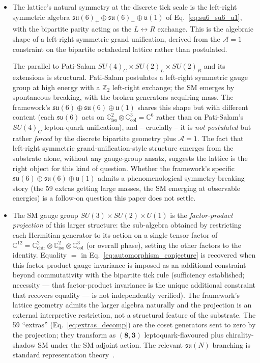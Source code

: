\begin{itemize}
\item The lattice's natural symmetry at the discrete tick scale
is the left-right symmetric algebra
$\mathfrak{su}(6)_+ \oplus \mathfrak{su}(6)_- \oplus \mathfrak{u}(1)$
of Eq.~\eqref{eq:su6_su6_u1}, with the bipartite parity acting as
the $L \leftrightarrow R$ exchange.  This is the algebraic shape
of a left-right symmetric grand unification, derived from the
$\mathcal{A}=1$ constraint on the bipartite octahedral lattice
rather than postulated.

The parallel to Pati-Salam $SU(4)_C \times SU(2)_L \times SU(2)_R$
and its extensions is structural.  Pati-Salam postulates a
left-right symmetric gauge group at high energy with a
$\mathbb{Z}_2$ left-right exchange; the SM emerges by spontaneous
breaking, with the broken generators acquiring mass.  The
framework's $\mathfrak{su}(6) \oplus \mathfrak{su}(6) \oplus
\mathfrak{u}(1)$ shares this shape but with different content
(each $\mathfrak{su}(6)$ acts on $\mathbb{C}^2_\text{iso} \otimes
\mathbb{C}^3_\text{col} = \mathbb{C}^6$ rather than on
Pati-Salam's $SU(4)_C$ lepton-quark unification), and -- crucially
-- it is \emph{not postulated} but rather \emph{forced} by the
discrete bipartite geometry plus $\mathcal{A}=1$.  The fact that
left-right symmetric grand-unification-style structure emerges
from the substrate alone, without any gauge-group ansatz,
suggests the lattice is the right object for this kind of
question.  Whether the framework's specific $\mathfrak{su}(6)
\oplus \mathfrak{su}(6) \oplus \mathfrak{u}(1)$ admits a
phenomenological symmetry-breaking story (the 59 extras getting
large masses, the SM emerging at observable energies) is a
follow-on question this paper does not settle.

\item The SM gauge group $SU(3) \times SU(2) \times U(1)$ is the
\emph{factor-product projection} of this larger structure: the
sub-algebra obtained by restricting each Hermitian generator to
its action on a single tensor factor of
$\mathbb{C}^{12} = \mathbb{C}^2_\text{chir} \otimes
\mathbb{C}^2_\text{iso} \otimes \mathbb{C}^3_\text{col}$ (or
overall phase), setting the other factors to the identity.
Equality $=$ in Eq.~\eqref{eq:automorphism_conjecture} is
recovered when this factor-product gauge invariance is imposed
as an additional constraint beyond commutativity with the
bipartite tick rule (sufficiency established; necessity --- that
factor-product invariance is the unique additional constraint that
recovers equality --- is not independently verified).  The
framework's lattice geometry admits the larger algebra naturally
and the projection is an external interpretive restriction, not a
structural feature of the substrate.  The 59
``extras'' (Eq.~\eqref{eq:extras_decomp}) are the coset generators
sent to zero by the projection; they transform as
$(\mathbf{8}, \mathbf{3})$ leptoquark-flavoured plus
chirality-shadow SM under the SM adjoint action.  The relevant
$\mathfrak{su}(N)$ branching is standard
representation theory~\cite{georgi1999lie}.


\end{itemize}
